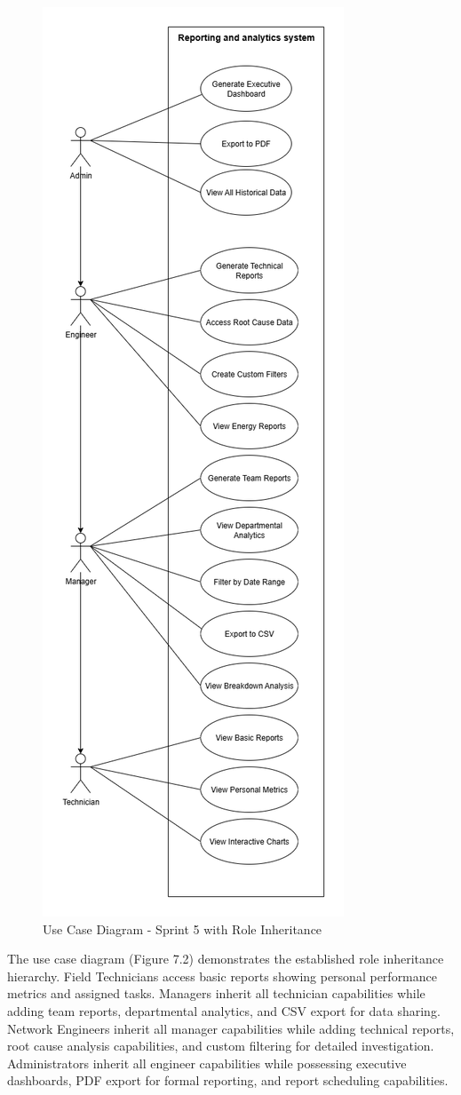 \begin{figure}[H]
    \centering
    \includegraphics[width=0.45\linewidth]{img/chap_07/sprint5_usecase_diagram.png}
    \caption{Use Case Diagram - Sprint 5 with Role Inheritance}
    \label{fig:use_case_diagram_sprint5}
\end{figure}

The use case diagram (Figure 7.2) demonstrates the established role inheritance hierarchy. Field Technicians access basic reports showing personal performance metrics and assigned tasks. Managers inherit all technician capabilities while adding team reports, departmental analytics, and CSV export for data sharing. Network Engineers inherit all manager capabilities while adding technical reports, root cause analysis capabilities, and custom filtering for detailed investigation. Administrators inherit all engineer capabilities while possessing executive dashboards, PDF export for formal reporting, and report scheduling capabilities.

